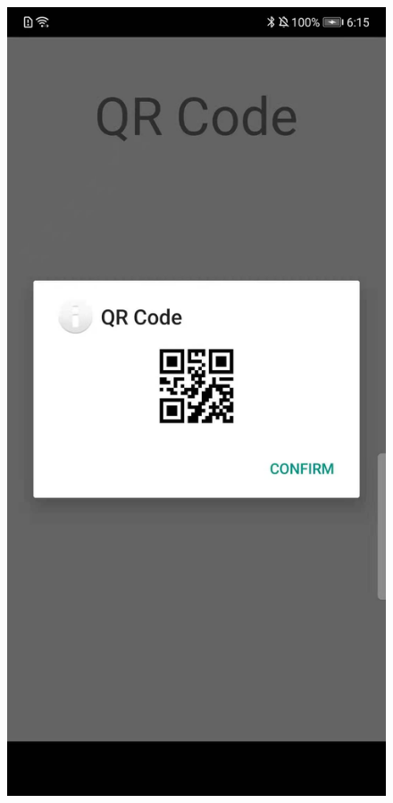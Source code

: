 \documentclass[12pt, a4paper]{article}
\theoremstyle{definition}
\begin{document}
\begin{figure}[htbp]
\begin{minipage}[t]{0.25\linewidth}
		\end{minipage}
	\linebreak
		\begin{minipage}[t]{0.25\linewidth}
		\centering
		\includegraphics[width=\linewidth]{5-3.jpeg}

\end{minipage}
\end{figure}
\end{document}
